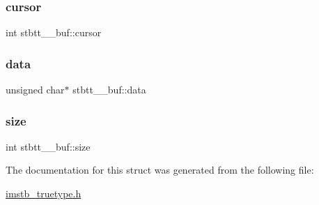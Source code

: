 \subsubsection{\texorpdfstring{cursor}{cursor}}
{\footnotesize\ttfamily int stbtt\+\_\+\+\_\+buf\+::cursor}

\mbox{\label{structstbtt____buf_a376d8cdacbc8295a7e88567ad52a0ac4}} 
\subsubsection{\texorpdfstring{data}{data}}
{\footnotesize\ttfamily unsigned char$\ast$ stbtt\+\_\+\+\_\+buf\+::data}

\mbox{\label{structstbtt____buf_a0f6f2d06981ab4a5697233bbd0cafb5b}} 
\subsubsection{\texorpdfstring{size}{size}}
{\footnotesize\ttfamily int stbtt\+\_\+\+\_\+buf\+::size}



The documentation for this struct was generated from the following file\+:\begin{DoxyCompactItemize}
\item 
\mbox{\hyperlink{imstb__truetype_8h}{imstb\+\_\+truetype.\+h}}\end{DoxyCompactItemize}
